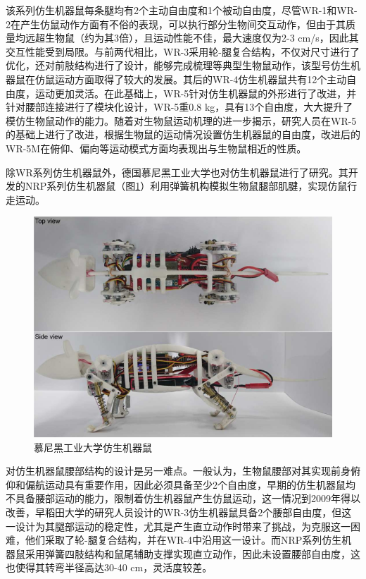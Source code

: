 该系列仿生机器鼠每条腿均有2个主动自由度和1个被动自由度\cite*{ishiiDevelopmentQuadrupedAnimaroid2009, ishiiDesignDevelopmentBiomimetic2009, shiDevelopmentHybridWheellegged2010, shiRobotratInteractionExperimental2011a, shiDevelopmentHybridWheelLegged2011, ishiiNovelMethodDevelop2013, shiBehaviorModulationRats2015a}，尽管WR-1和WR-2在产生仿鼠动作方面有不俗的表现，可以执行部分生物间交互动作，但由于其质量均远超生物鼠（约为其3倍），且运动性能不佳，最大速度仅为2-3 cm/s\cite*{ishiiDevelopmentQuadrupedAnimaroid2009, ishiiDesignDevelopmentBiomimetic2009}，因此其交互性能受到局限。与前两代相比，WR-3采用轮-腿复合结构，不仅对尺寸进行了优化，还对前肢结构进行了设计，能够完成梳理等典型生物鼠动作\cite{shiDevelopmentHybridWheellegged2010}，该型号仿生机器鼠在仿鼠运动方面取得了较大的发展。其后的WR-4仿生机器鼠共有12个主动自由度，运动更加灵活。在此基础上，WR-5针对仿生机器鼠的外形进行了改进，并针对腰部连接进行了模块化设计，WR-5重0.8 kg，具有13个自由度，大大提升了模仿生物鼠动作的能力\cite{shiBehaviorModulationRats2015a}。随着对生物鼠运动机理的进一步揭示，研究人员在WR-5的基础上进行了改进，根据生物鼠的运动情况设置仿生机器鼠的自由度，改进后的WR-5M在俯仰、偏向等运动模式方面均表现出与生物鼠相近的性质\cite{shiModifiedRoboticRat2018}。

除WR系列仿生机器鼠外，德国慕尼黑工业大学也对仿生机器鼠进行了研究。其开发的NRP系列仿生机器鼠（图\ref{figure_tum}）利用弹簧机构模拟生物鼠腿部肌腱，实现仿鼠行走运动\cite{lucasDesignBiomimeticRodent2018}。
\begin{figure}[htbp]
  \centering
  \includegraphics[width=0.5\linewidth]{images/ch01/tum.png}
  \caption{慕尼黑工业大学仿生机器鼠}\label{figure_tum} %
\end{figure}

对仿生机器鼠腰部结构的设计是另一难点。一般认为，生物鼠腰部对其实现前身俯仰和偏航运动具有重要作用，因此必须具备至少2个自由度\cite{shiDevelopmentHybridWheellegged2010}，早期的仿生机器鼠均不具备腰部运动的能力\cite{ishiiStressExposureUsing2012, ishiiDesignDevelopmentBiomimetic2009, ishiiDevelopmentQuadrupedAnimaroid2009, shiModulationRatBehaviour2013}，限制着仿生机器鼠产生仿鼠运动，这一情况到2009年得以改善，早稻田大学的研究人员设计的WR-3仿生机器鼠具备2个腰部自由度，但这一设计为其腿部运动的稳定性，尤其是产生直立动作时带来了挑战，为克服这一困难，他们采取了轮-腿复合结构，并在WR-4中沿用这一设计\cite{shiDevelopmentHybridWheellegged2010, shiRobotratInteractionExperimental2011a, shiDevelopmentHybridWheelLegged2011}。而NRP系列仿生机器鼠采用弹簧四肢结构和鼠尾辅助支撑实现直立动作，因此未设置腰部自由度，这也使得其转弯半径高达30-40 cm，灵活度较差\cite{lucasDesignBiomimeticRodent2018}。

